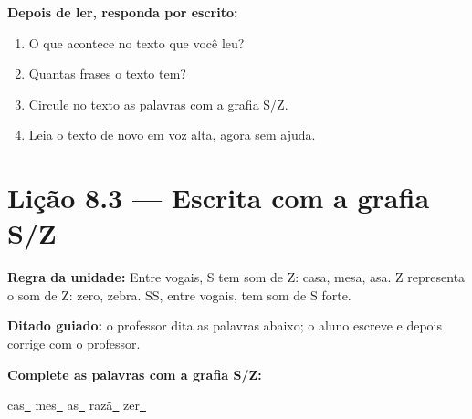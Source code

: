 \textbf{Depois de ler, responda por escrito:}
\begin{enumerate}

  \item O que acontece no texto que você leu?
  \begin{center}
  \underline{\hspace{12cm}}
  \end{center}

  \item Quantas frases o texto tem?
  \begin{center}
  \underline{\hspace{12cm}}
  \end{center}

  \item Circule no texto as palavras com a grafia S/Z.

  \item Leia o texto de novo em voz alta, agora sem ajuda.

\end{enumerate}

\section{Lição 8.3 --- Escrita com a grafia S/Z}

\noindent\textbf{Regra da unidade:} Entre vogais, S tem som de Z: casa, mesa, asa. Z representa o som de Z: zero, zebra. SS, entre vogais, tem som de S forte.


\noindent\textbf{Ditado guiado:} o professor dita as palavras abaixo; o aluno escreve e depois corrige com o professor.

\begin{center}
  \underline{\hspace{2.3cm}} \quad \underline{\hspace{2.3cm}} \quad \underline{\hspace{2.3cm}} \quad \underline{\hspace{2.3cm}}

  \underline{\hspace{2.3cm}} \quad \underline{\hspace{2.3cm}} \quad \underline{\hspace{2.3cm}} \quad \underline{\hspace{2.3cm}}
\end{center}

\noindent\textbf{Complete as palavras com a grafia S/Z:}
\begin{center}
  cas\underline{~} \quad mes\underline{~} \quad as\underline{~} \quad razã\underline{~} \quad zer\underline{~}
\end{center}

